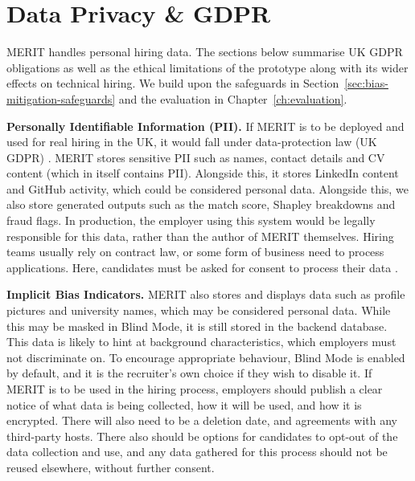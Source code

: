 \section{Data Privacy \& GDPR}
\label{sec:ethics-legal-societal}
\label{sec:data-privacy-gdpr}
MERIT handles personal hiring data. The sections below summarise UK GDPR obligations as well as the ethical limitations of
the prototype along with its wider effects on technical hiring. We build upon the safeguards in Section~\ref{sec:bias-mitigation-safeguards}
and the evaluation in Chapter~\ref{ch:evaluation}.

\textbf{Personally Identifiable Information (PII).} If MERIT is to be deployed and used for real hiring in the UK, it would fall under data-protection law (UK GDPR) \cite{uk_dpa_2018}.
MERIT stores sensitive PII such as names, contact details and CV content (which in itself contains PII).
Alongside this, it stores LinkedIn content and GitHub activity, which could be considered personal data.
Alongside this, we also store generated outputs such as the match score, Shapley breakdowns and fraud flags.
In production, the employer using this system would be legally responsible for this data, rather than the author of MERIT themselves.
Hiring teams usually rely on contract law, or some form of business need to process applications. Here, candidates must be asked for
consent to process their data \cite{ico_employment_2023}.

\textbf{Implicit Bias Indicators.} MERIT also stores and displays data such as profile pictures and university names, which may be considered personal data. While this
may be masked in Blind Mode, it is still stored in the backend database. This data is likely to hint at background characteristics,
which employers must not discriminate on. To encourage appropriate behaviour, Blind Mode is enabled by default, and it is the recruiter's
own choice if they wish to disable it. If MERIT is to be used in the hiring process, employers should publish a clear notice of what 
data is being collected, how it will be used, and how it is encrypted. There will also need to be a deletion date, and agreements with any third-party 
hosts. There also should be options for candidates to opt-out of the data collection and use, and any data gathered for this process
should not be reused elsewhere, without further consent.

